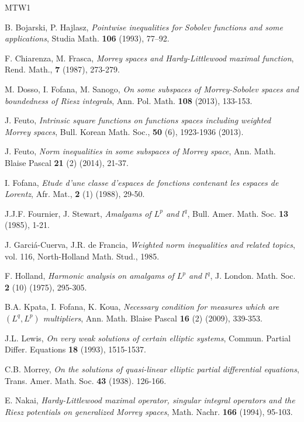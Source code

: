 \documentclass[a4paper,12pt,intlimits,oneside]{amsart}
\numberwithin{equation}{section}
\numberwithin{equation}{section}
\theoremstyle{definition}
\begin{document}
\begin{thebibliography}{MTW1}

 B. Bojarski, P. Hajlasz, \textit{Pointwise inequalities for Sobolev functions and
some applications}, Studia Math. \textbf{106} (1993), 77–92.

 F. Chiarenza, M. Frasca, \textit{Morrey spaces and Hardy-Littlewood maximal function}, Rend. Math., \textbf{7} (1987), 273-279.

 M. Dosso, I. Fofana, M. Sanogo, \textit{On some subspaces of Morrey-Sobolev spaces and boundedness
of Riesz integrals}, Ann. Pol. Math. \textbf{108} (2013), 133-153.


 J. Feuto, \textit{Intrinsic square functions on functions spaces including weighted  Morrey spaces}, Bull. Korean Math. Soc., \textbf{50} (6), 1923-1936 (2013).


 J. Feuto, \textit{Norm inequalities in some subspaces of Morrey space}, Ann. Math. Blaise Pascal \textbf{21} (2) (2014), 21-37.


 I. Fofana, \textit{Etude d'une classe d'espaces de fonctions contenant les espaces de Lorentz}, Afr. Mat., \textbf{2} (1) (1988), 29-50.

  J.J.F. Fournier, J. Stewart, \textit{Amalgams of $L^{p}$ and $l^{q}$}, Bull. Amer. Math. Soc. \textbf{13} (1985), 1-21.
 
  J. Garci\'a-Cuerva, J.R. de Francia, \textit{Weighted norm inequalities and related topics}, vol. 116, North-Holland Math. Stud., 1985.

 
  F. Holland, \textit{Harmonic analysis on amalgams of $L^{p}$ and $l^{q}$}, J. London. Math. Soc. \textbf{2} (10) (1975), 295-305.


 B.A. Kpata, I. Fofana, K. Koua, \textit{Necessary condition for measures which are $(L^q , L^p)$ multipliers}, Ann. Math. Blaise Pascal \textbf{16} (2) (2009), 339-353.


J.L. Lewis, \textit{On very weak solutions of certain elliptic systems}, Commun.
Partial Differ. Equations \textbf{18} (1993), 1515-1537.


 C.B. Morrey,  \textit{On the solutions of quasi-linear elliptic partial differential equations}, Trans. Amer. Math. Soc. \textbf{43} (1938). 126-166.

E. Nakai, \textit{Hardy-Littlewood maximal operator, singular integral operators and the Riesz potentials on generalized Morrey spaces}, Math. Nachr. \textbf{166} (1994), 95-103. 
             


\end{thebibliography}
\end{document}
